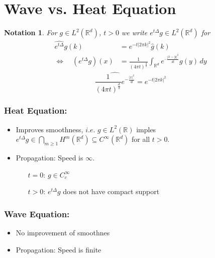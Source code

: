 \documentclass{report}
\theoremstyle{tommy}
\newtheorem{nota}[defn]{Notation}
\begin{document}
  \section{Wave vs. Heat Equation}
  \begin{nota}
    For \(g \in L^2(\mathbb{R}^d)\), \(t > 0\) we write \(e^{t\Delta} g \in L^2(\mathbb{R}^d)\) for 
    \begin{align*}
      \widehat{e^{t \Delta}} g(k) &= e^{-t |2 \pi k|^2} \hat g(k) \\
      \Leftrightarrow \quad (e^{t \Delta} g)(x) &= \frac{1}{(4 \pi t)^{\frac{d}{2}}} \int_{\mathbb{R}^d} e^{– \frac{|x-y|^2}{4t}} g(y) \, dy      
    \end{align*}
    \[\widehat{\frac{1}{(4 \pi t)^{\frac{d}{2}}}e ^{- \frac{|x|^2}{4t}}} = e^{-t|2 \pi k|^2}\]

  \end{nota}
  \begin{minipage}[t]{0.5 \textwidth}
    \subsubsection*{Heat Equation:} 
    \begin{itemize}
      \item Improves smoothness, \(i.e.\) \(g \in L^2(\mathbb{R})\) imples \(e^{t \Delta} g \in \bigcap_{m \ge 1} H^m(\mathbb{R}^d) \subseteq C^\infty(\mathbb{R}^d)\) for all \(t > 0\).
      \item Propagation: Speed is \(\infty\). \begin{itemize}
        \item [\(t=0\):] \(g \in C_c^\infty\)
        \item [\(t>0\):]\(e^{t \Delta} g\) does not have compact support
      \end{itemize}
    \end{itemize}
  \end{minipage}
  \begin{minipage}[t]{0.5 \textwidth}
    \subsubsection*{Wave Equation:}
    \begin{itemize}
      \item No improvement of smoothnes 
      \item Propagation: Speed is finite 
    \end{itemize}
  \end{minipage}
\end{document}
